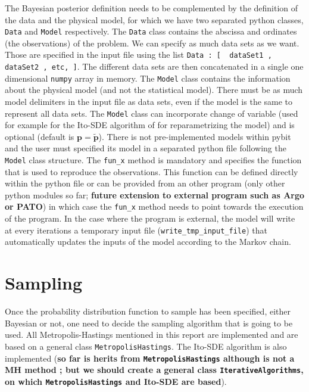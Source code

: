 \documentclass[a4paper,11pt]{article}
\begin{document}
The Bayesian posterior definition needs to be complemented by the definition of the data and the physical model, for which we have two separated python classes, \texttt{Data} and \texttt{Model} respectively. The \texttt{Data} class contains the abscissa and ordinates (the observations) of the problem. We can specify as much data sets as we want. Those are specified in the input file using the list \texttt{Data : [ { dataSet1 }, { dataSet2 }, etc, ]}. The different data sets are then concatenated in a single one dimensional \texttt{numpy} array in memory. The \texttt{Model} class contains the information about the physical model (and not the statistical model). There must be as much model delimiters in the input file as data sets, even if the model is the same to represent all data sets. The \texttt{Model} class can incorporate change of variable (used for example for the Ito-SDE algorithm of for reparametrizing the model) and is optional (default is $\mathbf{p} = \tilde{\mathbf{p}}$). There is not pre-implemented models within pybit and the user must specified its model in a separated python file following the \texttt{Model} class structure. The \texttt{fun\_x} method is mandatory and specifies the function that is used to reproduce the observations. This function can be defined directly within the python file or can be provided from an other program (only other python modules so far; \textbf{future extension to external program such as Argo or PATO}) in which case the \texttt{fun\_x} method needs to point towards the execution of the program. In the case where the program is external, the model will write at every iterations a temporary input file (\texttt{write\_tmp\_input\_file}) that automatically updates the inputs of the model according to the Markov chain.



\section{Sampling}

Once the probability distribution function to sample has been specified, either Bayesian or not, one need to decide the sampling algorithm that is going to be used. All Metropolis-Hastings mentioned in this report are implemented and are based on a general class \texttt{MetropolisHastings}. The Ito-SDE algorithm is also implemented (\textbf{so far is herits from \texttt{MetropolisHastings} although is not a MH method ; but we should create a general class \texttt{IterativeAlgorithms}, on which \texttt{MetropolisHastings} and Ito-SDE are based}).
\end{document}
